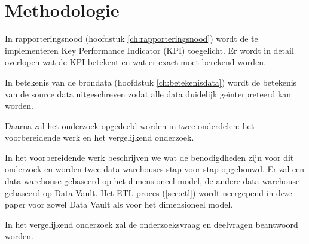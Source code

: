 
\chapter{Methodologie}
\label{ch:methodologie}

In rapporteringsnood (hoofdstuk \ref{ch:rapporteringsnood}) wordt de te implementeren Key Performance Indicator (KPI) toegelicht. Er wordt in detail overlopen wat de KPI betekent en wat er exact moet berekend worden.

In betekenis van de brondata (hoofdstuk \ref{ch:betekenisdata}) wordt de betekenis van de source data uitgeschreven zodat alle data duidelijk geïnterpreteerd kan worden.

Daarna zal het onderzoek opgedeeld worden in twee onderdelen: het voorbereidende werk en het vergelijkend onderzoek. 

In het voorbereidende werk beschrijven we wat de benodigdheden zijn voor dit onderzoek en worden twee data warehouses stap voor stap opgebouwd. Er zal een data warehouse gebaseerd op het dimensioneel model, de andere data warehouse gebaseerd op Data Vault. Het ETL-proces (\ref{sec:etl}) wordt neergepend in deze paper voor zowel Data Vault als voor het dimensioneel model.

In het vergelijkend onderzoek zal de onderzoeksvraag en deelvragen beantwoord worden. 